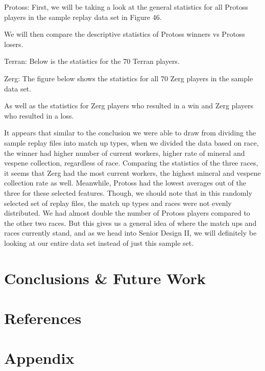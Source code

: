 \documentclass[a4paper,12pt]{report}
\begin{document}
Protoss:
First, we will be taking a look at the general statistics for all Protoss players in the sample replay data set in Figure 46. 

We will then compare the descriptive statistics of Protoss winners vs Protoss losers. 


Terran:
Below is the statistics for the 70 Terran players. 


Zerg:
The figure below shows the statistics for all 70 Zerg players in the sample data set. 

As well as the statistics for Zerg players who resulted in a win and Zerg players who resulted in a loss. 

It appears that similar to the conclusion we were able to draw from dividing the sample replay files into match up types, when we divided the data based on race, the winner had higher number of current workers, higher rate of mineral and vespene collection, regardless of race. Comparing the statistics of the three races, it seems that Zerg had the most current workers, the highest mineral and vespene collection rate as well. Meanwhile, Protoss had the lowest averages out of the three for these selected features. Though, we should note that in this randomly selected set of replay files, the match up types and races were not evenly distributed. We had almost double the number of Protoss players compared to the other two races. But this gives us a general idea of where the match ups and races currently stand, and as we head into Senior Design II, we will definitely be looking at our entire data set instead of just this sample set.



\chapter{Conclusions \& Future Work}
\chapter{References}
\chapter{Appendix}
\end{document}
